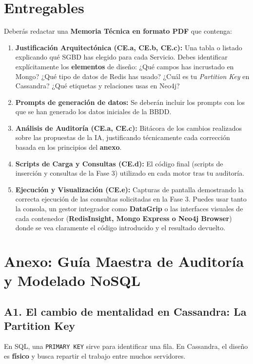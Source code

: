 \documentclass[12pt,a4paper]{article}
\begin{document}
\section{Entregables}
Deberás redactar una \textbf{Memoria Técnica en formato PDF} que contenga:
\begin{enumerate}
    \item \textbf{Justificación Arquitectónica (CE.a, CE.b, CE.c):} Una tabla o listado explicando qué SGBD has elegido para cada Servicio. Debes identificar explícitamente los \textbf{elementos} de diseño: ¿Qué campos has incrustado en Mongo? ¿Qué tipo de datos de Redis has usado? ¿Cuál es tu \textit{Partition Key} en Cassandra? ¿Qué etiquetas y relaciones usas en Neo4j?
    \item \textbf{Prompts de generación de datos: } Se deberán incluir los prompts con los que se han generado los datos iniciales de la BBDD.
    \item \textbf{Análisis de Auditoría (CE.a, CE.c):} Bitácora de los cambios realizados sobre las propuestas de la IA, justificando técnicamente cada corrección basada en los principios del \textbf{anexo}.
    \item \textbf{Scripts de Carga y Consultas (CE.d):} El código final (scripts de inserción y consultas de la Fase 3) utilizado en cada motor tras tu auditoría.
    \item \textbf{Ejecución y Visualización (CE.e):} Capturas de pantalla demostrando la correcta ejecución de las consultas solicitadas en la Fase 3. Puedes usar tanto la consola, un gestor integrador como \textbf{DataGrip} o las interfaces visuales de cada contenedor (\textbf{RedisInsight, Mongo Express o Neo4j Browser}) donde se vea claramente el código introducido y el resultado devuelto.
\end{enumerate}

\appendix
\section*{Anexo: Guía Maestra de Auditoría y Modelado NoSQL}

\subsection*{A1. El cambio de mentalidad en Cassandra: La Partition Key}
En SQL, una \texttt{PRIMARY KEY} sirve para identificar una fila. En Cassandra, el diseño es \textbf{físico} y busca repartir el trabajo entre muchos servidores.
\end{document}

